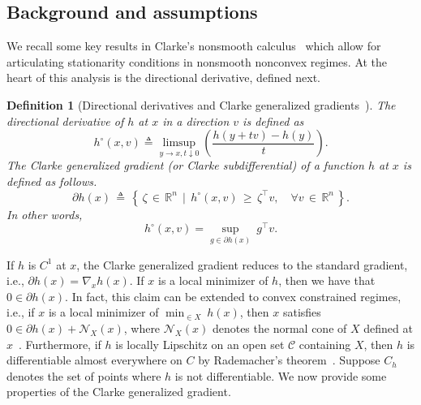 \documentclass[11pt,reqno]{amsart}
\newcommand{\1}{{\bf 1}}
\newcommand{\2}{{\bf 2}}
\newcommand{\mr}[1]{{\color{blue}#1}}
\numberwithin{equation}{section}
\newtheorem{definition}{Definition}[section]
\theoremstyle{remark}
\begin{document}
{	\subsection{Background and assumptions}\label{sec:5.1}
	We recall some key results in Clarke's nonsmooth calculus~\cite{clarke98} which allow for articulating stationarity conditions in nonsmooth nonconvex regimes. At the heart of this analysis is the directional derivative,  defined next. \\
	\begin{definition}[Directional derivatives and Clarke generalized gradients~\cite{clarke98}]\label{Def:Calrkesubgrad}  
		The directional derivative of $h$ at $x$ in a direction $v$ is defined as 
		\begin{equation}
			h^{\circ}(x,v) \triangleq  \limsup_{y \to x, t \downarrow 0} \left(\frac{h(y+tv)-h(y)}{t}\right).
		\end{equation} 
		The Clarke generalized gradient (or Clarke subdifferential) of a function $h$ at $x$ is defined as follows.
		\begin{equation}
			\partial h(x) \, \triangleq \, \left\{ \, \zeta \, \in \, \mathbb{R}^n\, \mid\, h^{\circ}(x,v) \, \geq \,  \zeta^\top v, \quad \forall v \, \in \, \mathbb{R}^n\,\right\}.
		\end{equation}
		In other words, 
		$$h^{\circ}(x,v) =  \sup_{g \in \partial h(x)}  \ g^{\top}v.$$ 
	\end{definition}
	If $h$ is $C^1$ at $x$, the Clarke
	generalized gradient reduces to the standard gradient, {i.e.,} $\partial h(x)
	= \nabla_{x} h(x).$ If $x$ is a local minimizer of $h$, then we have that $0
	\in \partial h(x)$. In fact, this claim can be extended to convex constrained
	regimes, {i.e.,} if $x$ is a local minimizer of $\displaystyle \min_{ \in
		X} \ h(x)$, then $x$ satisfies $0 \in \partial h(x) + \mathcal{N}_X(x)$,
	where $\mathcal{N}_{X}(x)$ denotes the normal cone of $X$ defined at
	$x$~\cite{clarke98}. Furthermore, if $h$ is locally Lipschitz on an open set
	{$\mathcal{C}$} containing $X$, then $h$ is differentiable almost everywhere
	on $C$ by Rademacher's theorem~\cite{clarke98}. Suppose $C_h$ denotes the set
	of points where $h$ is not differentiable. We now provide some properties of
	the Clarke generalized gradient.   %
	
}
\end{document}
